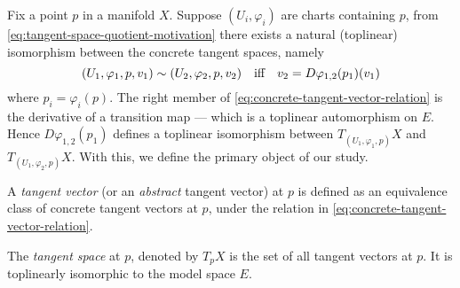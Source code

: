 \documentclass[../main-v2-manifolds.tex]{subfiles}
\begin{document}
Fix a point $p$ in a manifold $X$. Suppose $(U_i,\varphi_i)$ are charts containing $p$, from \cref{eq:tangent-space-quotient-motivation} there exists a natural (toplinear) isomorphism between the concrete tangent spaces, namely 
\begin{equation}\label{eq:concrete-tangent-vector-relation}
    (U_1,\varphi_1,p,v_1)\sim (U_2,\varphi_2,p,v_2)\qqtext{iff} v_2 = D\varphi_{1,2}(p_1)(v_1)
\end{equation}
where $p_i = \varphi_i (p)$. The right member of \cref{eq:concrete-tangent-vector-relation}  is the derivative of a transition map --- which is a toplinear automorphism on $E$. Hence $D\varphi_{1,2}(p_1)$ defines a toplinear isomorphism between $T_{(U_1,\varphi_1,p)}X$ and $T_{(U_1,\varphi_2,p)}X$. With this, we define the primary object of our study.
\begin{definition}\label{def:tangent-vector}
    A \emph{tangent vector} (or an \emph{abstract} tangent vector) at $p$ is defined as an equivalence class of concrete tangent vectors at $p$, under the relation in \cref{eq:concrete-tangent-vector-relation}.
\end{definition}

\begin{definition}\label{def:tangent-space}
    The \emph{tangent space} at $p$, denoted by $T_p X$ is the set of all tangent vectors at $p$. It is toplinearly isomorphic to the model space $E$.
\end{definition}
\end{document}

